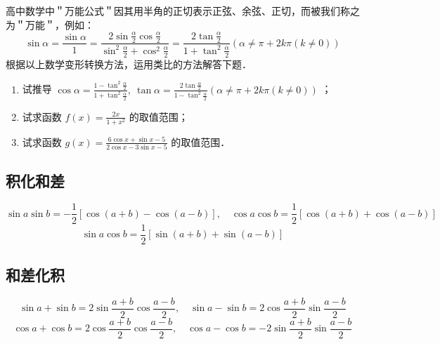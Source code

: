 \begin{example}
    高中数学中＂万能公式＂因其用半角的正切表示正弦、余弦、正切，而被我们称之为＂万能＂，例如：
    $$\sin \alpha=\frac{\sin \alpha}{1}=\frac{2 \sin \frac{\alpha}{2} \cos \frac{\alpha}{2}}{\sin ^2 \frac{\alpha}{2}+\cos ^2 \frac{\alpha}{2}}=\frac{2 \tan \frac{\alpha}{2}}{1+\tan ^2 \frac{\alpha}{2}}(\alpha \neq \pi+2 k \pi(k \neq 0))$$
    根据以上数学变形转换方法，运用类比的方法解答下题．
    \begin{enumerate}
        \item 试推导 $\cos \alpha=\frac{1-\tan ^2 \frac{\alpha}{2}}{1+\tan ^2 \frac{\alpha}{2}}, ~ \tan \alpha=\frac{2 \tan \frac{\alpha}{2}}{1-\tan ^2 \frac{\alpha}{2}}(\alpha \neq \pi+2 k \pi(k \neq 0))$ ；
        \item 试求函数 $f(x)=\frac{2 x}{1+x^2}$ 的取值范围；
        \item 试求函数 $g(x)=\frac{6 \cos x+\sin x-5}{2 \cos x-3 \sin x-5}$ 的取值范围．
    \end{enumerate}
\end{example}

\subsection{积化和差}

\begin{theorem}[积化和差公式]
    $$\sin a\sin b = -\frac{1}{2}\left[\cos(a+b)-\cos(a-b)\right], \quad
        \cos a\cos b = \frac{1}{2}\left[\cos(a+b)+\cos(a-b)\right]$$
    $$\sin a\cos b = \frac{1}{2}\left[\sin(a+b)+\sin(a-b)\right]$$
\end{theorem}

\subsection{和差化积}

\begin{theorem}[和差化积公式]
    $$\sin a+\sin b = 2\sin \frac{a+b}{2}\cos \frac{a-b}{2}, \quad
        \sin a-\sin b = 2\cos \frac{a+b}{2}\sin \frac{a-b}{2}$$
    $$\cos a+ \cos b = 2\cos \frac{a+b}{2}\cos \frac{a-b}{2}, \quad
        \cos a- \cos b = -2\sin \frac{a+b}{2}\sin \frac{a-b}{2}$$
\end{theorem}

